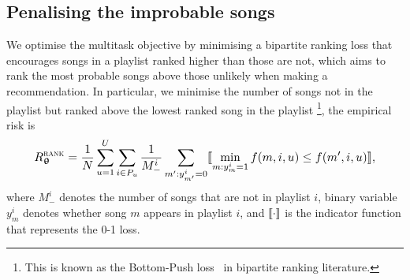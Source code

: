 \subsection{Penalising the improbable songs}
\label{ssec:bploss}

%
%
We optimise the multitask objective by minimising a bipartite ranking loss 
that encourages songs in a playlist ranked higher than those are not, 
which aims to rank the most probable songs above those unlikely when making a recommendation.
In particular, we minimise the number of songs not in the playlist but ranked above the lowest ranked song in the playlist
\footnote{This is known as the Bottom-Push loss~\cite{rudin2009p} in bipartite ranking literature.},
\ie the %
empirical risk is
\begin{equation}
\label{eq:bprisk}
\resizebox{.9\linewidth}{!}{$\displaystyle
R_{\upthetabm}^{\textsc{rank}} = \frac{1}{N} \sum_{u=1}^U \sum_{i \in P_u} \frac{1}{M_-^i} \sum_{m': y_{m'}^i = 0} 
\llb \min_{m: y_m^i = 1} f(m, i, u) \le f(m', i, u) \rrb,
$}
\end{equation}
where $M_-^i$ denotes the number of songs that are not in playlist $i$,
binary variable $y_m^i$ denotes whether song $m$ appears in playlist $i$,
and $\llbracket \cdot \rrbracket$ is the indicator function that represents the 0-1 loss.

